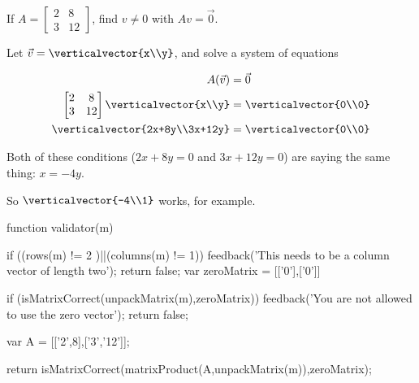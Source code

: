 \documentclass{ximera}
\begin{document}
\begin{question}
  If $A = \begin{bmatrix} 2 & 8\\3&12\end{bmatrix}$, find $v \neq 0$ with $Av = \vec{0}$.
  \begin{solution}
  \begin{hint}
  	Let $\vec{v} = \verticalvector{x\\y}$, and solve a system of equations
  \end{hint}
  \begin{hint}
  	\begin{align*}
  		A(\vec{v}) &= \vec{0}\\
  		\begin{bmatrix} 2 & 8\\3&12\end{bmatrix}\verticalvector{x\\y}  &=\verticalvector{0\\0}\\
  		\verticalvector{2x+8y\\3x+12y} &= \verticalvector{0\\0}
  	\end{align*}
  \end{hint}
  \begin{hint}
  	Both of these conditions ($2x+8y  =0$ and $3x+12y = 0$) are saying the same thing:  $x = -4y$.
  \end{hint}
  \begin{hint}
  	So $\verticalvector{-4\\1}$ works, for example.
  \end{hint}
  

  	\begin{matrix-answer}[name=v]
  		function validator(m){
  		if ((rows(m) != 2 )||(columns(m) != 1)){
  			feedback('This needs to be a column vector of length two');
  			return false;
  			}
  		var zeroMatrix = [['0'],['0']]
  		
  		if (isMatrixCorrect(unpackMatrix(m),zeroMatrix)){
  			feedback('You are not allowed to use the zero vector');
  			return false;
  			}
  		
  		var A = [['2',8],['3','12']];
  		
  		return isMatrixCorrect(matrixProduct(A,unpackMatrix(m)),zeroMatrix);
  		}
  	\end{matrix-answer}
  \end{solution}
\end{question}
	
\end{document}
